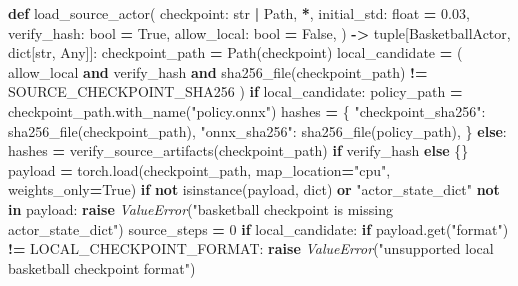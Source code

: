 \documentclass[
  american,
  11pt,
  letterpaper,
]{article}
\newenvironment{Shaded}{\begin{snugshade}}{\end{snugshade}}
\newcommand{\BuiltInTok}[1]{#1}
\newcommand{\ControlFlowTok}[1]{\textcolor[rgb]{0.13,0.29,0.53}{\textbf{#1}}}
\newcommand{\DecValTok}[1]{\textcolor[rgb]{0.00,0.00,0.81}{#1}}
\newcommand{\FloatTok}[1]{\textcolor[rgb]{0.00,0.00,0.81}{#1}}
\newcommand{\KeywordTok}[1]{\textcolor[rgb]{0.13,0.29,0.53}{\textbf{#1}}}
\newcommand{\NormalTok}[1]{#1}
\newcommand{\OperatorTok}[1]{\textcolor[rgb]{0.81,0.36,0.00}{\textbf{#1}}}
\newcommand{\PreprocessorTok}[1]{\textcolor[rgb]{0.56,0.35,0.01}{\textit{#1}}}
\newcommand{\StringTok}[1]{\textcolor[rgb]{0.31,0.60,0.02}{#1}}
\newcommand{\VariableTok}[1]{\textcolor[rgb]{0.00,0.00,0.00}{#1}}
\renewenvironment{Shaded}{\par\smallskip}{\par\smallskip}
\begin{document}
\begin{Shaded}
\begin{Highlighting}[]
\KeywordTok{def}\NormalTok{ load\_source\_actor(}
\NormalTok{    checkpoint: }\BuiltInTok{str} \OperatorTok{|}\NormalTok{ Path,}
    \OperatorTok{*}\NormalTok{,}
\NormalTok{    initial\_std: }\BuiltInTok{float} \OperatorTok{=} \FloatTok{0.03}\NormalTok{,}
\NormalTok{    verify\_hash: }\BuiltInTok{bool} \OperatorTok{=} \VariableTok{True}\NormalTok{,}
\NormalTok{    allow\_local: }\BuiltInTok{bool} \OperatorTok{=} \VariableTok{False}\NormalTok{,}
\NormalTok{) }\OperatorTok{{-}\textgreater{}} \BuiltInTok{tuple}\NormalTok{[BasketballActor, }\BuiltInTok{dict}\NormalTok{[}\BuiltInTok{str}\NormalTok{, Any]]:}
\NormalTok{    checkpoint\_path }\OperatorTok{=}\NormalTok{ Path(checkpoint)}
\NormalTok{    local\_candidate }\OperatorTok{=}\NormalTok{ (}
\NormalTok{        allow\_local }\KeywordTok{and}\NormalTok{ verify\_hash}
        \KeywordTok{and}\NormalTok{ sha256\_file(checkpoint\_path) }\OperatorTok{!=}\NormalTok{ SOURCE\_CHECKPOINT\_SHA256}
\NormalTok{    )}
    \ControlFlowTok{if}\NormalTok{ local\_candidate:}
\NormalTok{        policy\_path }\OperatorTok{=}\NormalTok{ checkpoint\_path.with\_name(}\StringTok{"policy.onnx"}\NormalTok{)}
\NormalTok{        hashes }\OperatorTok{=}\NormalTok{ \{}
            \StringTok{"checkpoint\_sha256"}\NormalTok{: sha256\_file(checkpoint\_path),}
            \StringTok{"onnx\_sha256"}\NormalTok{: sha256\_file(policy\_path),}
\NormalTok{        \}}
    \ControlFlowTok{else}\NormalTok{:}
\NormalTok{        hashes }\OperatorTok{=}\NormalTok{ verify\_source\_artifacts(checkpoint\_path) }\ControlFlowTok{if}\NormalTok{ verify\_hash }\ControlFlowTok{else}\NormalTok{ \{\}}
\NormalTok{    payload }\OperatorTok{=}\NormalTok{ torch.load(checkpoint\_path, map\_location}\OperatorTok{=}\StringTok{"cpu"}\NormalTok{, weights\_only}\OperatorTok{=}\VariableTok{True}\NormalTok{)}
    \ControlFlowTok{if} \KeywordTok{not} \BuiltInTok{isinstance}\NormalTok{(payload, }\BuiltInTok{dict}\NormalTok{) }\KeywordTok{or} \StringTok{"actor\_state\_dict"} \KeywordTok{not} \KeywordTok{in}\NormalTok{ payload:}
        \ControlFlowTok{raise} \PreprocessorTok{ValueError}\NormalTok{(}\StringTok{"basketball checkpoint is missing actor\_state\_dict"}\NormalTok{)}
\NormalTok{    source\_steps }\OperatorTok{=} \DecValTok{0}
    \ControlFlowTok{if}\NormalTok{ local\_candidate:}
        \ControlFlowTok{if}\NormalTok{ payload.get(}\StringTok{"format"}\NormalTok{) }\OperatorTok{!=}\NormalTok{ LOCAL\_CHECKPOINT\_FORMAT:}
            \ControlFlowTok{raise} \PreprocessorTok{ValueError}\NormalTok{(}\StringTok{"unsupported local basketball checkpoint format"}\NormalTok{)}

\end{Highlighting}
\end{Shaded}
\end{document}
